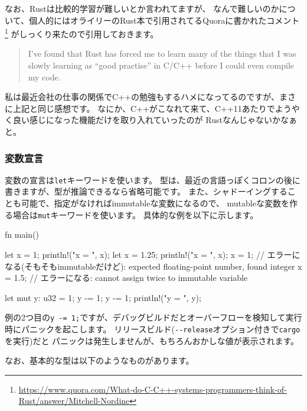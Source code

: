 \documentclass[mingoth,a4paper]{jsarticle}
\begin{document}
なお、Rustは比較的学習が難しいとか言われてますが、
なんで難しいのかについて、個人的にはオライリーのRust本で引用されてるQuoraに書かれたコメント%
\footnote{\url{https://www.quora.com/What-do-C-C++-systems-programmers-think-of-Rust/answer/Mitchell-Nordine}}%
がしっくり来たので引用しておきます。
\begin{quotation}
I've found that Rust has forced me to learn many of the things that I was slowly learning as
``good practise'' in C/C++ before I could even compile my code.
\end{quotation}
私は最近会社の仕事の関係でC++の勉強もするハメになってるのですが、まさに上記と同じ感想です。
なにか、C++がこなれて来て、C++11あたりでようやく良い感じになった機能だけを取り入れていったのが
Rustなんじゃないかなぁと。

\subsubsection{変数宣言}

変数の宣言は\texttt{let}キーワードを使います。
型は、最近の言語っぽくコロンの後に書きますが、型が推論できるなら省略可能です。
また、シャドーイングすることも可能で、指定がなければimmutableな変数になるので、
mutableな変数を作る場合は\texttt{mut}キーワードを使います。
具体的な例を以下に示します。

\begin{commandline}
fn main() {
    let x = 1;
    println!("x = {}", x);
    let x = 1.25;
    println!("x = {}", x);
    x = 1;   // エラーになる(そもそもimmutableだけど): expected floating-point number, found integer
    x = 1.5; // エラーになる: cannot assign twice to immutable variable

    let mut y: u32 = 1;
    y -= 1;
    y -= 1;
    println!("y = {}", y);
}
\end{commandline}

例の2つ目の\verb|y -= 1;|ですが、デバッグビルドだとオーバーフローを検知して実行時にパニックを起こします。
リリースビルド(\verb|--release|オプション付きで\texttt{cargo}を実行)だと
パニックは発生しませんが、もちろんおかしな値が表示されます。

なお、基本的な型は以下のようなものがあります。
\end{document}

